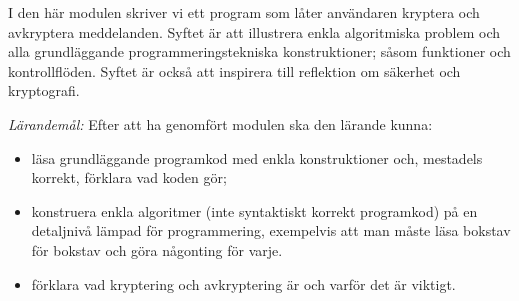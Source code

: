 
I den här modulen skriver vi ett program som låter användaren kryptera och 
avkryptera meddelanden.
Syftet är att illustrera enkla algoritmiska problem och alla grundläggande 
programmeringstekniska konstruktioner; såsom funktioner och kontrollflöden.
Syftet är också att inspirera till reflektion om säkerhet och kryptografi.

\emph{Lärandemål:}
Efter att ha genomfört modulen ska den lärande kunna:
\begin{itemize}
  \item läsa grundläggande programkod med enkla konstruktioner
    och, mestadels korrekt, förklara vad koden gör;
  \item konstruera enkla algoritmer (inte syntaktiskt korrekt programkod) på en 
    detaljnivå lämpad för programmering, exempelvis att man måste läsa bokstav 
    för bokstav och göra någonting för varje.
  \item förklara vad kryptering och avkryptering är och varför det är viktigt.
\end{itemize}
